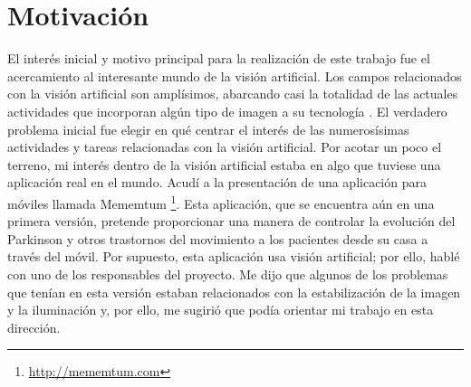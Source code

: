 \documentclass[a4paper,openright, 12pt]{book}
\begin{document}
\chapter*{Motivación}\label{cap.introduccion}
%
\thispagestyle{empty} 
El interés inicial y motivo principal para la realización de este trabajo fue el acercamiento al interesante mundo de la visión artificial. Los campos relacionados con la visión artificial son amplísimos, abarcando casi la totalidad de las actuales actividades que incorporan algún tipo de imagen a su tecnología . El verdadero problema inicial fue elegir en qué centrar el interés de las numerosísimas actividades y tareas relacionadas con la visión artificial. Por acotar un poco el terreno, mi interés dentro de la visión artificial estaba en algo que tuviese una aplicación real en el mundo. Acudí a la presentación de una aplicación para móviles llamada Mememtum \footnote{\url{http://mememtum.com}}. Esta aplicación, que se encuentra aún en una primera versión, pretende proporcionar una manera de controlar la evolución del Parkinson y otros trastornos del movimiento a los pacientes desde su casa a través del móvil. Por supuesto, esta aplicación usa visión artificial; por ello, hablé con uno de los responsables del proyecto. Me dijo que algunos de los problemas que tenían en esta versión estaban relacionados con la estabilización de la imagen y la iluminación y, por ello, me sugirió que podía orientar mi trabajo en esta dirección.
\end{document}

